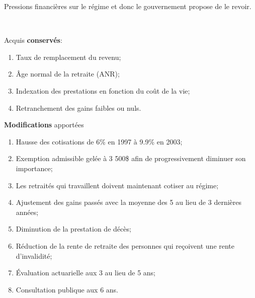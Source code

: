 \documentclass[10pt, french]{article}
\begin{document}
\begin{multicols*}{3}
\begin{rappel_enhanced}[Réforme de 1998]
Pressions financières sur le régime et donc le gouvernement propose de le revoir.

\

Acquis \textbf{conservés}:
\begin{enumerate}[leftmargin = *]
	\item	Taux de remplacement du revenu;
	\item	Âge normal de la retraite (ANR);
	\item	Indexation des prestations en fonction du coût de la vie;
	\item	Retranchement des gains faibles ou nuls.
\end{enumerate}

\textbf{Modifications} apportées
\begin{enumerate}[leftmargin = *]
	\item	Hausse des cotisations de 6\% en 1997 à 9.9\% en 2003;
	\item	Exemption admissible gelée à 3 500\$ afin de progressivement diminuer son importance;
	\item	Les retraités qui travaillent doivent maintenant cotiser au régime;
	\item	Ajustement des gains passés avec la moyenne des 5 au lieu de 3 dernières années;
	\item	Diminution de la prestation de décès;
	\item	Réduction de la rente de retraite des personnes qui reçoivent une rente d'invalidité;
	\item	Évaluation actuarielle aux 3 au lieu de 5 ans;
	\item	Consultation publique aux 6 ans.
\end{enumerate}
\end{rappel_enhanced}


\end{multicols*}
\end{document}
